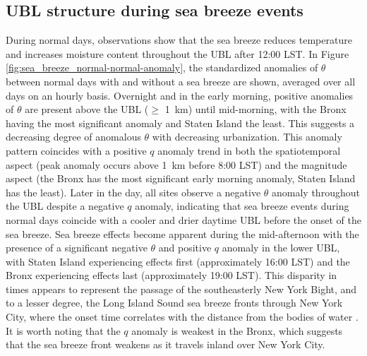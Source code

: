 \documentclass[11pt,a4paper]{article}
\begin{document}
\subsection{UBL structure during sea breeze events}
During normal days, observations show that the sea breeze reduces temperature and increases moisture content throughout the UBL after 12:00 LST. In Figure \ref{fig:sea_breeze_normal-normal-anomaly}, the standardized anomalies of $\theta$ between normal days with and without a sea breeze are shown, averaged over all days on an hourly basis. Overnight and in the early morning, positive anomalies of $\theta$ are present above the UBL ($\geq$ \SI{1}{\kilo\meter}) until mid-morning, with the Bronx having the most significant anomaly and Staten Island the least. This suggests a decreasing degree of anomalous $\theta$ with decreasing urbanization. This anomaly pattern coincides with a positive $q$ anomaly trend in both the spatiotemporal aspect (peak anomaly occurs above \SI{1}{\kilo\meter} before 8:00 LST) and the magnitude aspect (the Bronx has the most significant early morning anomaly, Staten Island has the least). Later in the day, all sites observe a negative $\theta$ anomaly throughout the UBL despite a negative $q$ anomaly, indicating that sea breeze events during normal days coincide with a cooler and drier daytime UBL before the onset of the sea breeze. Sea breeze effects become apparent during the mid-afternoon with the presence of a significant negative $\theta$ and positive $q$ anomaly in the lower UBL, with Staten Island experiencing effects first (approximately 16:00 LST) and the Bronx experiencing effects last (approximately 19:00 LST). This disparity in times appears to represent the passage of the southeasterly New York Bight, and to a lesser degree, the Long Island Sound sea breeze fronts through New York City, where the onset time correlates with the distance from the bodies of water \citep{bornstein1981}. It is worth noting that the $q$ anomaly is weakest in the Bronx, which suggests that the sea breeze front weakens as it travels inland over New York City.
\\ \\
\end{document}
